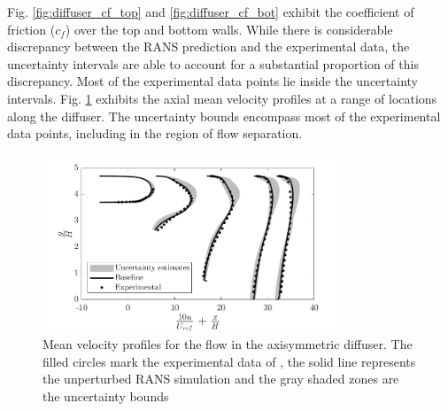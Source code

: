 Fig. \ref{fig:diffuser_cf_top} and \ref{fig:diffuser_cf_bot} exhibit the coefficient of friction ($c_f$) over the top and bottom walls. While there is considerable discrepancy between the RANS prediction and the experimental data, the uncertainty intervals are able to account for a substantial proportion of this discrepancy. Most of the experimental data points lie inside the uncertainty intervals. Fig. \ref{fig:diffuser_vel_prof} exhibits the axial mean velocity profiles at a range of locations along the diffuser. The uncertainty bounds encompass most of the experimental data points, including in the region of flow separation. 

\begin{figure}
\centering
\includegraphics[width=0.8\textwidth]{suthesis/images/diffuser_vel_prof.png}
\caption{Mean velocity profiles for the flow in the axisymmetric diffuser. The filled circles mark the experimental data of \cite{buice}, the solid line represents the unperturbed RANS simulation and the gray shaded zones are the uncertainty bounds\label{fig:diffuser_vel_prof}}
\end{figure}



